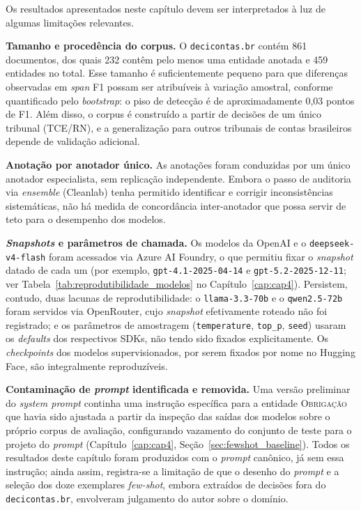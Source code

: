 Os resultados apresentados neste capítulo devem ser interpretados à luz de algumas limitações relevantes.

\textbf{Tamanho e procedência do corpus.} O \texttt{decicontas.br} contém 861 documentos, dos quais 232 contêm pelo menos uma entidade anotada e 459 entidades no total. Esse tamanho é suficientemente pequeno para que diferenças observadas em \textit{span} F1 possam ser atribuíveis à variação amostral, conforme quantificado pelo \textit{bootstrap}: o piso de detecção é de aproximadamente 0,03 pontos de F1. Além disso, o corpus é construído a partir de decisões de um único tribunal (TCE/RN), e a generalização para outros tribunais de contas brasileiros depende de validação adicional.

\textbf{Anotação por anotador único.} As anotações foram conduzidas por um único anotador especialista, sem replicação independente. Embora o passo de auditoria via \textit{ensemble} (Cleanlab) tenha permitido identificar e corrigir inconsistências sistemáticas, não há medida de concordância inter-anotador que possa servir de teto para o desempenho dos modelos.

\textbf{\textit{Snapshots} e parâmetros de chamada.} Os modelos da OpenAI e o \texttt{deepseek-v4-flash} foram acessados via Azure AI Foundry, o que permitiu fixar o \textit{snapshot} datado de cada um (por exemplo, \texttt{gpt-4.1-2025-04-14} e \texttt{gpt-5.2-2025-12-11}; ver Tabela~\ref{tab:reprodutibilidade_modelos} no Capítulo~\ref{cap:cap4}). Persistem, contudo, duas lacunas de reprodutibilidade: o \texttt{llama-3.3-70b} e o \texttt{qwen2.5-72b} foram servidos via OpenRouter, cujo \textit{snapshot} efetivamente roteado não foi registrado; e os parâmetros de amostragem (\texttt{temperature}, \texttt{top\_p}, \texttt{seed}) usaram os \textit{defaults} dos respectivos SDKs, não tendo sido fixados explicitamente. Os \textit{checkpoints} dos modelos supervisionados, por serem fixados por nome no Hugging Face, são integralmente reproduzíveis.

\textbf{Contaminação de \textit{prompt} identificada e removida.} Uma versão preliminar do \textit{system prompt} continha uma instrução específica para a entidade \textsc{Obrigação} que havia sido ajustada a partir da inspeção das saídas dos modelos sobre o próprio corpus de avaliação, configurando vazamento do conjunto de teste para o projeto do \textit{prompt} (Capítulo~\ref{cap:cap4}, Seção~\ref{sec:fewshot_baseline}). Todos os resultados deste capítulo foram produzidos com o \textit{prompt} canônico, já sem essa instrução; ainda assim, registra-se a limitação de que o desenho do \textit{prompt} e a seleção dos doze exemplares \textit{few-shot}, embora extraídos de decisões fora do \texttt{decicontas.br}, envolveram julgamento do autor sobre o domínio.

